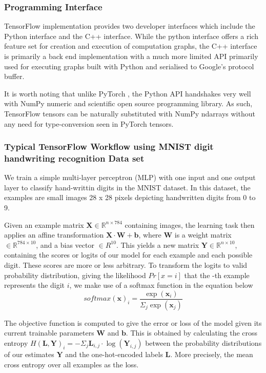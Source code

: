 \subsubsection{Programming Interface}
TensorFlow implementation provides two developer interfaces which include the Python interface and the C++ interface.  While the python interface offers a rich feature set for creation and execution of computation graphs, the C++ interface is primarily a back end implementation with a much more limited API primarily used for executing graphs built with Python and serialised to Google’s protocol buffer.

It is worth noting that unlike PyTorch \citep{ketkar2017introduction}, the Python API handshakes very well with NumPy\citep{numpy} numeric and scientific open source programming library. As such, TensorFlow tensors can be naturally substituted with NumPy ndarrays without any need for type-conversion seen in PyTorch tensors.
\subsubsection{Typical TensorFlow Workflow using MNIST digit handwriting recognition Data set}\label{sec_c3_tfwf}
We train a simple multi-layer perceptron (MLP) with one input and one output layer to classify hand-writtin digits in the MNIST\citep{krizhevsky2012imagenet} dataset.   In this dataset, the examples are small images 28 x 28 pixels depicting handwritten digits from 0 to 9.

Given an example matrix $\mathbf{X}\in\mathbb{R}^{n\times 784}$ containing  images, the learning task then applies an affine transformation $\mathbf{X\cdot W+b}$, where $\mathbf{W}$ is a weight matrix $\in \mathbb{R}^{784 \times 10}$, and a bias vector $\in R^{10}$.  This yields a new matrix $\mathbf{Y}\in \mathbb{R}^{n\times 10}$, containing the scores or logits of our model for each example and each possible digit.  These scores are more or less arbitrary.  To transform the logits to valid probability distribution, giving the likelihood $Pr[x=i]$ that the -th example represents the digit $i$, we make use of a softmax function in the equation below
\begin{equation}
softmax(\mathbf{x})_i=\frac{\exp(\mathbf{x}_i)}{\Sigma_j\exp(\mathbf{x}_j)}\label{eqn_c3_smax00}
\end{equation} 

The objective function is computed to give the error or loss of the model given its current trainable parameters $\mathbf{W}$ and $\mathbf{b}$.  This is obtained by  calculating the  cross entropy     $H(\mathbf{L,Y})_i=−\Sigma_j\mathbf{L}_{i,j}\cdot\log(\mathbf{Y}_{i,j})$
between the probability distributions of our estimates $\mathbf{Y}$ and the one-hot-encoded labels $\mathbf{L}$.  More precisely, the mean cross entropy over all examples as the loss.

